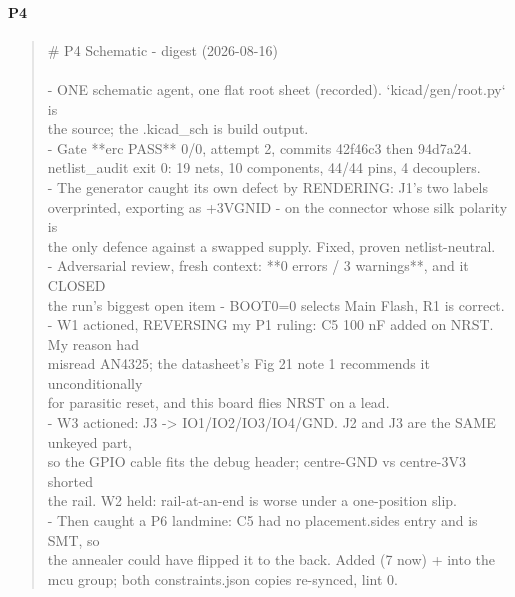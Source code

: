 \documentclass[11pt,a4paper]{article}
\begin{document}
\paragraph*{P4}
\begin{quote}\small\ttfamily\raggedright
\# P4 Schematic - digest (2026-08-16)\\
~\\
- ONE schematic agent, one flat root sheet (recorded). `kicad/gen/root.py` is\\
  the source; the .kicad\_sch is build output.\\
- Gate {*}{*}erc PASS{*}{*} 0/0, attempt 2, commits 42f46c3 then 94d7a24.\\
  netlist\_audit exit 0: 19 nets, 10 components, 44/44 pins, 4 decouplers.\\
- The generator caught its own defect by RENDERING: J1's two labels\\
  overprinted, exporting as +3VGNID - on the connector whose silk polarity is\\
  the only defence against a swapped supply. Fixed, proven netlist-neutral.\\
- Adversarial review, fresh context: {*}{*}0 errors / 3 warnings{*}{*}, and it CLOSED\\
  the run's biggest open item - BOOT0=0 selects Main Flash, R1 is correct.\\
- W1 actioned, REVERSING my P1 ruling: C5 100 nF added on NRST. My reason had\\
  misread AN4325; the datasheet's Fig 21 note 1 recommends it unconditionally\\
  for parasitic reset, and this board flies NRST on a lead.\\
- W3 actioned: J3 -\textgreater{} IO1/IO2/IO3/IO4/GND. J2 and J3 are the SAME unkeyed part,\\
  so the GPIO cable fits the debug header; centre-GND vs centre-3V3 shorted\\
  the rail. W2 held: rail-at-an-end is worse under a one-position slip.\\
- Then caught a P6 landmine: C5 had no placement.sides entry and is SMT, so\\
  the annealer could have flipped it to the back. Added (7 now) + into the\\
  mcu group; both constraints.json copies re-synced, lint 0.
\end{quote}
\end{document}
